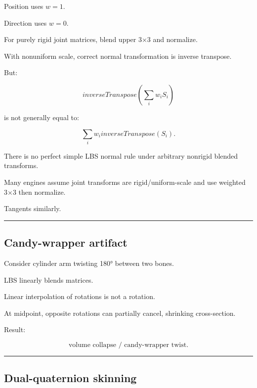 \hypertarget{04-visual-computing-ii-ch041-skinning-normalstangents}{}

Position uses \(w=1\).

Direction uses \(w=0\).

For purely rigid joint matrices, blend upper 3×3 and normalize.

With nonuniform scale, correct normal transformation is inverse transpose.

But:

\[
inverseTranspose
\left(
\sum_iw_iS_i
\right)
\]

is not generally equal to:

\[
\sum_iw_i
inverseTranspose(S_i).
\]

There is no perfect simple LBS normal rule under arbitrary nonrigid blended transforms.

Many engines assume joint transforms are rigid/uniform-scale and use weighted 3×3 then normalize.

Tangents similarly.

\begin{center}\rule{0.5\linewidth}{0.5pt}\end{center}

\subsection{Candy-wrapper artifact}\label{04-visual-computing-ii-ch041-candy-wrapper-artifact}

\hypertarget{04-visual-computing-ii-ch041-candy-wrapper-artifact}{}

Consider cylinder arm twisting 180° between two bones.

LBS linearly blends matrices.

Linear interpolation of rotations is not a rotation.

At midpoint, opposite rotations can partially cancel, shrinking cross-section.

Result:

\[
\boxed{
\text{volume collapse / candy-wrapper twist}.
}
\]

\begin{center}\rule{0.5\linewidth}{0.5pt}\end{center}

\subsection{Dual-quaternion skinning}\label{04-visual-computing-ii-ch041-dual-quaternion-skinning}


